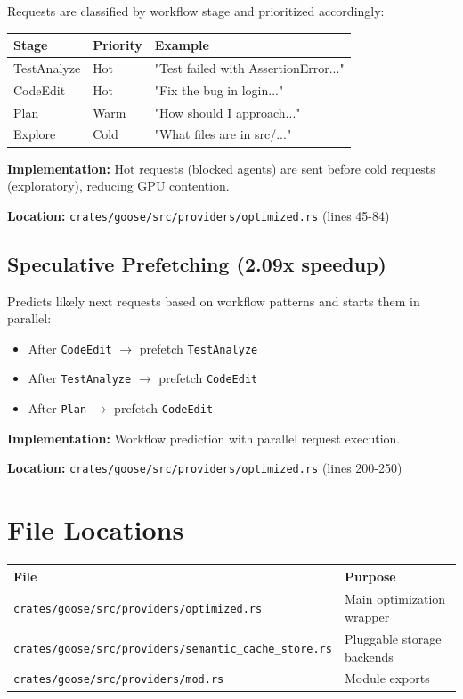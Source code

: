 \documentclass[11pt]{article}
\begin{document}
Requests are classified by workflow stage and prioritized accordingly:

\begin{table}[h]
\centering
\begin{tabular}{lll}
\toprule
\textbf{Stage} & \textbf{Priority} & \textbf{Example} \\
\midrule
TestAnalyze & Hot & "Test failed with AssertionError..." \\
CodeEdit & Hot & "Fix the bug in login..." \\
Plan & Warm & "How should I approach..." \\
Explore & Cold & "What files are in src/..." \\
\bottomrule
\end{tabular}
\end{table}

\textbf{Implementation:} Hot requests (blocked agents) are sent before cold requests (exploratory), reducing GPU contention.

\textbf{Location:} \texttt{crates/goose/src/providers/optimized.rs} (lines 45-84)

\subsection{Speculative Prefetching (2.09x speedup)}

Predicts likely next requests based on workflow patterns and starts them in parallel:

\begin{itemize}
    \item After \texttt{CodeEdit} $\rightarrow$ prefetch \texttt{TestAnalyze}
    \item After \texttt{TestAnalyze} $\rightarrow$ prefetch \texttt{CodeEdit}
    \item After \texttt{Plan} $\rightarrow$ prefetch \texttt{CodeEdit}
\end{itemize}

\textbf{Implementation:} Workflow prediction with parallel request execution.

\textbf{Location:} \texttt{crates/goose/src/providers/optimized.rs} (lines 200-250)

\section{File Locations}

\begin{table}[h]
\centering
\begin{tabular}{ll}
\toprule
\textbf{File} & \textbf{Purpose} \\
\midrule
\texttt{crates/goose/src/providers/optimized.rs} & Main optimization wrapper \\
\texttt{crates/goose/src/providers/semantic\_cache\_store.rs} & Pluggable storage backends \\
\texttt{crates/goose/src/providers/mod.rs} & Module exports \\
\bottomrule
\end{tabular}
\end{table}
\end{document}
